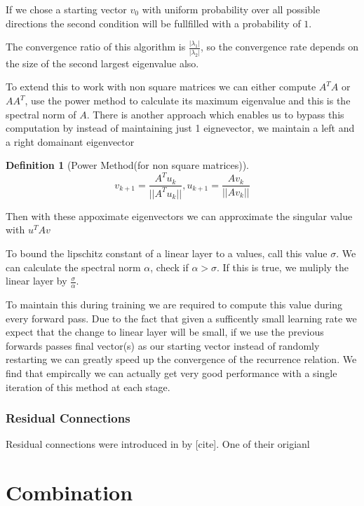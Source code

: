 \documentclass[12pt, a4paper]{report}
\theoremstyle{definition}
\newtheorem{definition}{Definition}[section]
\begin{document}
If we chose a starting vector $v_0$ with uniform probability over all possible directions the second condition will be fullfilled with a probability of $1$.

The convergence ratio of this algorithm is $\frac{|\lambda_1|}{|\lambda_2|}$, so the convergence rate depends on the size of the second largest eigenvalue also.


To extend this to work with non square matrices we can either compute $A^TA$ or $AA^T$, use the power method to calculate its maximum eigenvalue and this is the spectral norm of $A$.
There is another approach which enables us to bypass this computation by instead of maintaining just 1 eignevector, we maintain a left and a right domainant eigenvector

\begin{definition}[Power Method(for non square matrices)]
    $$v_{k+1} = \frac{A^Tu_k}{||A^Tu_k||}, u_{k+1} = \frac{Av_k}{||Av_k||} $$
\end{definition}

Then with these appoximate eigenvectors we can approximate the singular value with $u^T A v$

To bound the lipschitz constant of a linear layer to a values, call this value $\sigma$. We can calculate the spectral norm $\alpha$, check if $\alpha > \sigma$. If this is true, we muliply the linear layer by $\frac{\sigma}{\alpha}$.

To maintain this during training we are required to compute this value during every forward pass. Due to the fact that given a sufficently small learning rate we expect that the change to linear layer will be small, if we use the previous forwards passes final vector(s) as our starting vector instead of randomly restarting we can greatly speed up the convergence of the recurrence relation. We find that empircally we can actually get very good performance with a single iteration of this method at each stage.


\subsection{Residual Connections}

Residual connections were introduced in by [cite]. One of their origianl 



\chapter{Combination}
\label{Chap5}
\end{document}

